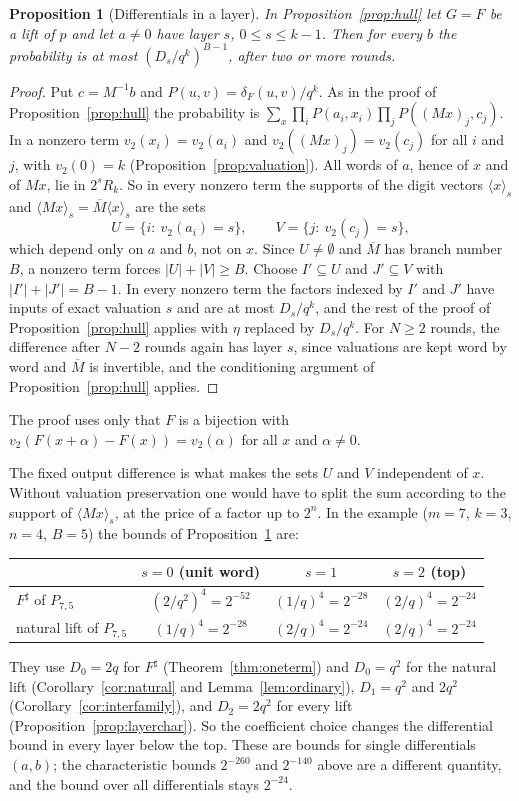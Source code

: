 \documentclass[11pt]{article}
\newtheorem{proposition}[theorem]{Proposition}
\theoremstyle{definition}
\theoremstyle{remark}
\newcommand{\ol}[1]{\overline{#1}}
\begin{document}
\begin{proposition}[Differentials in a layer]\label{prop:hullunit}
In Proposition~\ref{prop:hull} let $G=F$ be a lift of $p$ and let $a\ne0$ have layer $s$, $0\le s\le k-1$. Then for
every $b$ the probability is at most $(D_s/q^k)^{B-1}$, after two or more rounds.
\end{proposition}
\begin{proof}
Put $c=M^{-1}b$ and $P(u,v)=\delta_F(u,v)/q^k$. As in the proof of Proposition~\ref{prop:hull} the probability is
$\sum_x\prod_iP(a_i,x_i)\prod_jP((Mx)_j,c_j)$. In a nonzero term $v_2(x_i)=v_2(a_i)$ and $v_2((Mx)_j)=v_2(c_j)$ for all
$i$ and $j$, with $v_2(0)=k$ (Proposition~\ref{prop:valuation}). All words of $a$, hence of $x$ and of $Mx$, lie in
$2^sR_k$. So in every nonzero term the supports of the digit vectors $\langle x\rangle_s$ and
$\langle Mx\rangle_s=\ol M\langle x\rangle_s$ are the sets
\[
U=\{i:\ v_2(a_i)=s\},\qquad V=\{j:\ v_2(c_j)=s\},
\]
which depend only on $a$ and $b$, not on $x$. Since $U\ne\emptyset$ and $\ol M$ has branch number $B$, a nonzero term
forces $|U|+|V|\ge B$. Choose $I'\subseteq U$ and $J'\subseteq V$ with $|I'|+|J'|=B-1$. In every nonzero term the
factors indexed by $I'$ and $J'$ have inputs of exact valuation $s$ and are at most $D_s/q^k$, and the rest of the
proof of Proposition~\ref{prop:hull} applies with $\eta$ replaced by $D_s/q^k$. For $N\ge2$ rounds, the difference after
$N-2$ rounds again has layer $s$, since valuations are kept word by word and $\ol M$ is invertible, and the
conditioning argument of Proposition~\ref{prop:hull} applies.
\end{proof}
The proof uses only that $F$ is a bijection with $v_2(F(x+\alpha)-F(x))=v_2(\alpha)$ for all $x$ and $\alpha\ne0$.

The fixed output difference is what makes the sets $U$ and $V$ independent of $x$. Without valuation preservation one
would have to split the sum according to the support of $\langle Mx\rangle_s$, at the price of a factor up to $2^n$.
In the example ($m=7$, $k=3$, $n=4$, $B=5$) the bounds of Proposition~\ref{prop:hullunit} are:
\begin{center}
\begin{tabular}{lccc}
\toprule
 & $s=0$ (unit word) & $s=1$ & $s=2$ (top)\\ \midrule
 $F^\sharp$ of $P_{7,5}$ & $(2/q^2)^4=2^{-52}$ & $(1/q)^4=2^{-28}$ & $(2/q)^4=2^{-24}$\\
 natural lift of $P_{7,5}$ & $(1/q)^4=2^{-28}$ & $(2/q)^4=2^{-24}$ & $(2/q)^4=2^{-24}$\\ \bottomrule
\end{tabular}
\end{center}
They use $D_0=2q$ for $F^\sharp$ (Theorem~\ref{thm:oneterm}) and $D_0=q^2$ for the natural lift (Corollary~\ref{cor:natural}
and Lemma~\ref{lem:ordinary}), $D_1=q^2$ and $2q^2$ (Corollary~\ref{cor:interfamily}), and $D_2=2q^2$ for every lift
(Proposition~\ref{prop:layerchar}). So the coefficient choice changes the differential bound in every layer below the
top. These are bounds for single differentials $(a,b)$; the characteristic bounds $2^{-260}$ and $2^{-140}$ above are a
different quantity, and the bound over all differentials stays $2^{-24}$.
\end{document}

